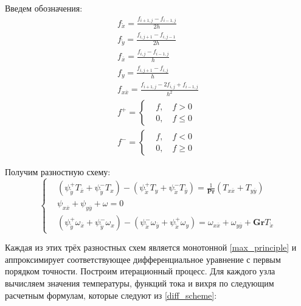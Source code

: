 \documentclass[a4paper, 12pt]{article}
\newcommand{\Pra}{\mathbf{Pr}}
\newcommand{\Gra}{\mathbf{Gr}}
\newcommand{\psp}[2]{\psi_{\mathring{#1}}^{#2}}
\begin{document}
    Введем обозначения:
    \begin{gather*}
      f_{\mathring{x}} = \frac{f_{i+1,j} - f_{i-1,j}}{2 h}
      \\
      f_{\mathring{y}} = \frac{f_{i,j+1} - f_{i,j-1}}{2 h}
      \\
      f_{\overline{x}} = \frac{f_{i,j} - f_{i-1,j}}{h}
      \\
      f_{y} = \frac{f_{i,j+1} - f_{i,j}}{h}
      \\
      f_{x \overline{x}} = \frac{f_{i+1,j} - 2 f_{i,j} + f_{i-1,j}}{h^2}
      \\
      f^{+} = \left\{
        \begin{aligned}
          &f, \quad f > 0\\
          &0, \quad f \leq 0
        \end{aligned}
      \right.
      \\
      f^{-} = \left\{
        \begin{aligned}
          &f, \quad f < 0\\
          &0, \quad f \geq 0
        \end{aligned}
      \right.
    \end{gather*}

    Получим разностную схему:
    \begin{equation}
      \left\{
        \begin{aligned}
          &\left( \psp{y}{+} T_{\overline{x}} + \psp{y}{-} T_{x} \right) -
            \left( \psp{x}{+} T_{y} + \psp{x}{-} T_{\overline{y}} \right) =
            \frac{1}{\Pra}\left( T_{x \overline{x}} + T_{y \overline{y}} \right)
          \\
          &\psi_{x \overline{x}} + \psi_{y \overline{y}} + \omega = 0
          \\
          &\left(
            \psp{y}{+} \omega_{\overline{x}} + \psp{y}{-} \omega_{x}
          \right) - \left(
            \psp{x}{-} \omega_{\overline{y}} + \psp{x}{+} \omega_{y}
          \right) =
            \omega_{x \overline{x}} + \omega_{y \overline{y}} +
            \Gra T_{\mathring{x}}
        \end{aligned}
      \right.\label{diff_scheme}
    \end{equation}

    Каждая из этих трёх разностных схем является монотонной
    \eqref{max_principle} и аппроксимирует соответствующее дифференциальное
    уравнение с первым порядком точности. Построим итерационный процесс. Для
    каждого узла вычисляем значения температуры, функций тока и вихря по
    следующим расчетным формулам, которые следуют из \eqref{diff_scheme}:
\end{document}
